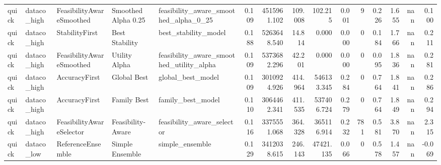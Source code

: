 \begin{table}
{\begin{tabular}{lllllrrrrrrrrrr}
   quick &    dataco\_high &  FeasibilityAwareSmoothed &   Smoothed Alpha 0.25 &              feasibility\_aware\_smoothed\_alpha\_0\_25 & 0.109 &     4515961.102 &              109.008 &            102.215 &                     0.001 &                   9 &                       0.226 &                  1.655 &               nan &                  0.100 \\
   quick &    dataco\_high &            StabilityFirst &        Best Stability &                               best\_stability\_model & 0.188 &     5263648.540 &               14.814 &              0.000 &                     0.000 &                   0 &                       0.184 &                  1.766 &               nan &                  0.211 \\
   quick &    dataco\_high &  FeasibilityAwareSmoothed &         Utility Alpha &           feasibility\_aware\_smoothed\_utility\_alpha & 0.109 &     5373682.296 &               42.201 &              0.000 &                     0.000 &                   0 &                       0.095 &                  1.836 &               nan &                  0.281 \\
   quick &    dataco\_high &             AccuracyFirst &           Global Best &                                  global\_best\_model & 0.109 &     3010924.926 &              414.964 &         546133.345 &                     0.284 &                   0 &                       0.764 &                  1.841 &               nan &                  0.286 \\
   quick &    dataco\_high &             AccuracyFirst &           Family Best &                                  family\_best\_model & 0.110 &     3064462.341 &              411.535 &         537406.724 &                     0.279 &                   0 &                       0.764 &                  1.849 &               nan &                  0.294 \\
   quick &    dataco\_high &  FeasibilityAwareSelector &     Feasibility-Aware &                         feasibility\_aware\_selector & 0.116 &     3375551.068 &              364.328 &         365116.914 &                     0.232 &                 781 &                       0.581 &                  3.870 &               nan &                  2.315 \\
   quick &     dataco\_low &         ReferenceEnsemble &       Simple Ensemble &                                    simple\_ensemble & 0.129 &     3412038.615 &              246.143 &          47421.135 &                     0.066 &                   0 &                       0.578 &                  1.457 &               nan &                 -0.069 \\

\end{tabular}}
\end{table}
